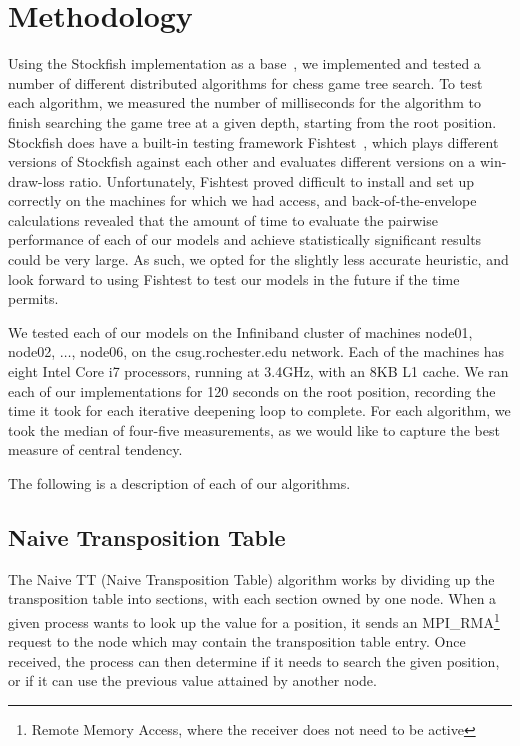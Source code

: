 \documentclass{article}
\begin{document}
\section{Methodology}\label{Algorithms}
Using the Stockfish implementation as a base~\cite{stockfish:code},
we implemented and tested a number
of different distributed algorithms for chess game tree search. To test each
algorithm, we measured the number of milliseconds for the algorithm to finish
searching the game tree at a given depth, starting from the root position.
Stockfish does have a built-in testing framework Fishtest~\cite{fishtest},
which plays different versions of Stockfish against each other and evaluates
different versions on a win-draw-loss ratio. Unfortunately, Fishtest proved
difficult to install and set up correctly on the machines for which we had
access, and back-of-the-envelope calculations revealed that the amount of time
to evaluate the pairwise performance of each of our models and achieve
statistically significant results could be very large. As such, we opted for the
slightly less accurate heuristic, and look forward to using Fishtest to test our
models in the future if the time permits.

We tested each of our models on the Infiniband cluster of machines
node01, node02, $\hdots$, node06, on the csug.rochester.edu network.
Each of the machines has eight Intel Core i7 processors, running at 3.4GHz, with
an 8KB L1 cache. We ran each of our implementations for 120
seconds on the root position, recording the time it took for each iterative
deepening loop to complete. For each algorithm, we took the median of four-five
measurements, as we would like to capture the best measure of central tendency.

The following is a description of each of our algorithms.

\subsection{Naive Transposition Table}
The Naive TT (Naive Transposition Table) algorithm works by dividing up the
transposition table into sections, with each section owned by one node. When a
given process wants to look up the value for a position, it sends an
{MPI\_RMA}\footnote{Remote Memory Access, where the receiver does not need to be active}
request to the node which may contain the transposition table entry. Once
received, the process can then determine if it needs to search the given
position, or if it can use the previous value attained by another node.
\end{document}
